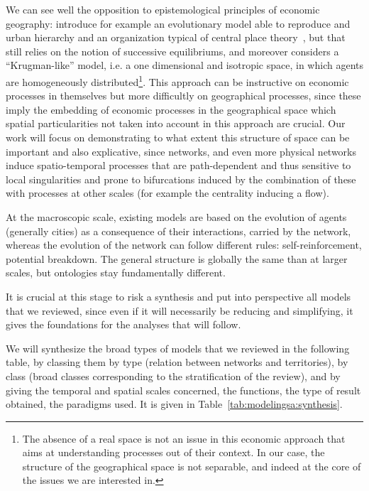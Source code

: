 \documentclass[galley]{jtlu-article-2col}
\begin{document}
We can see well the opposition to epistemological principles of economic geography: \cite{fujita1999evolution} introduce for example an evolutionary model able to reproduce and urban hierarchy and an organization typical of central place theory~\cite{banos2011christaller}, but that still relies on the notion of successive equilibriums, and moreover considers a ``Krugman-like'' model, i.e. a one dimensional and isotropic space, in which agents are homogeneously distributed\footnote{The absence of a real space is not an issue in this economic approach that aims at understanding processes out of their context. In our case, the structure of the geographical space is not separable, and indeed at the core of the issues we are interested in.}. This approach can be instructive on economic processes in themselves but more difficultly on geographical processes, since these imply the embedding of economic processes in the geographical space which spatial particularities not taken into account in this approach are crucial. Our work will focus on demonstrating to what extent this structure of space can be important and also explicative, since networks, and even more physical networks induce spatio-temporal processes that are path-dependent and thus sensitive to local singularities and prone to bifurcations induced by the combination of these with processes at other scales (for example the centrality inducing a flow).

At the macroscopic scale, existing models are based on the evolution of agents (generally cities) as a consequence of their interactions, carried by the network, whereas the evolution of the network can follow different rules: self-reinforcement, potential breakdown. The general structure is globally the same than at larger scales, but ontologies stay fundamentally different.



It is crucial at this stage to risk a synthesis and put into perspective all models that we reviewed, since even if it will necessarily be reducing and simplifying, it gives the foundations for the analyses that will follow.

We will synthesize the broad types of models that we reviewed in the following table, by classing them by type (relation between networks and territories), by class (broad classes corresponding to the stratification of the review), and by giving the temporal and spatial scales concerned, the functions, the type of result obtained, the paradigms used. It is given in Table~\ref{tab:modelingsa:synthesis}.
\end{document}
